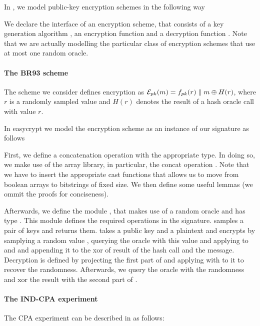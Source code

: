 In \EasyCrypt, we model public-key encryption schemes in the following way


We declare the interface of an encryption scheme, that consists of a
key generation algorithm , an encryption function  and
a decryption function . Note that we are actually modelling
the particular class of encryption schemes that use at most one random
oracle.

\paragraph{The BR93 scheme}
The scheme we consider defines encryption as 
$\mathcal{E}_{pk}(m) = f_{pk}(r) \parallel m \oplus H(r)$, where $r$ is a
randomly sampled value and $H(r)$ denotes the result of a hash oracle
call with value $r$.

 In easycrypt we model the encryption scheme as an instance of our
  signature as follows


First, we define a concatenation operation with the appropriate
type. In doing so, we make use of the array library, in particular,
the concat operation \ec{||}. Note that we have to insert the
appropriate cast functions that allows us to move from boolean arrays
to bitstrings of fixed size. We then define some useful lemmas (we
ommit the proofs for conciseness).

Afterwards, we define the module , that makes use of a random
oracle  and has type . This module defines the
required operations in the  signature.  samples a
pair of keys and returns them.  takes a public key  and
a plaintext  and encrypts by samplying a random value ,
querying the oracle with this value and applying  to  and
 and appending it to the xor of result of the hash call and the
message. Decryption is defined by projecting the first part of 
and applying  with  to it to recover the
randomness. Afterwards, we query the oracle with the randomness and
xor the result with the second part of .

\paragraph{The \textsf{IND-CPA} experiment}
The CPA experiment can be described in \EasyCrypt as follows:

